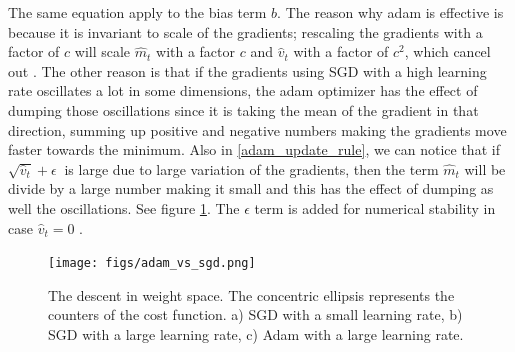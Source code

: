 The same equation apply to the bias term $b$. The reason why adam is effective is because it is invariant to scale of the gradients; rescaling the gradients with a factor of $c$ will scale $\hat{m}_t$ with a factor $c$ and $\hat{v}_t$ with a factor of $c^2$, which cancel out \cite{adam}.
The other reason is that if the gradients using SGD with a high learning rate oscillates a lot in some dimensions, the adam optimizer has the effect of dumping those oscillations since it is taking the mean of the gradient in that direction, summing up positive and negative numbers making the gradients move faster towards the minimum. Also in \cref{adam_update_rule}, we can notice that if $\sqrt{\hat{v}_t} + \epsilon \ $ is large due to large variation of the gradients, then the term $\hat{m}_t$ will be divide by a large number making it small and this has the effect of dumping as well the oscillations. See figure \cref{adam_vs_SGD}. The $\epsilon$ term is added for numerical stability in case $\hat{v}_t = 0$ \cite{hAN}.

\begin{figure}[H]
  \centering
  \texttt{[image: figs/adam\_vs\_sgd.png]}
  \caption[The descent in weight space]{The descent in weight space. The concentric ellipsis represents the counters of the cost function. a) SGD with a small learning rate, b) SGD with a large learning rate, c) Adam with a large learning rate.}
  \label{adam_vs_SGD}
\end{figure}
